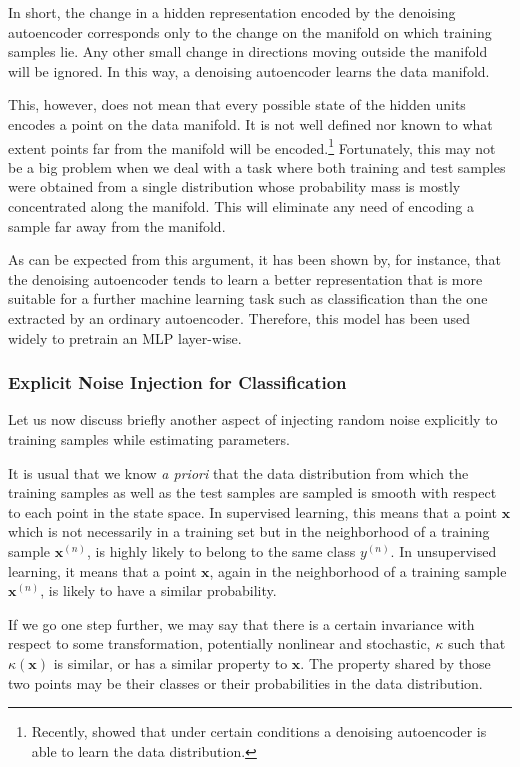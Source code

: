\documentclass{now}
\newcommand{\vect}[1]{\mathbf{#1}}
\newcommand{\vx}[0]{\vect{x}}
\begin{document}
In short, the change in a hidden representation encoded by the denoising
autoencoder corresponds only to the change on the manifold on which training
samples lie. Any other small change in directions moving outside the manifold
will be ignored. In this way, a denoising autoencoder learns the data manifold.

This, however, does not mean that every possible state of the hidden units
encodes a point on the data manifold. It is not well defined nor known to what
extent points far from the manifold will be encoded.\footnote{
    Recently, \citet{Bengio2014,Bengio2013nips} showed that under certain
    conditions a denoising autoencoder is able to learn the data distribution.
}
Fortunately, this may not be a big problem when we deal with a task where both
training and test samples were obtained from a single distribution whose
probability mass is mostly concentrated along the manifold. This will eliminate
any need of encoding a sample far away from the manifold.

As can be expected from this argument, it has been shown by, for instance,
\citet{Vincent2010} that the denoising autoencoder tends to learn a better
representation that is more suitable for a further machine learning task such as
classification than the one extracted by an ordinary autoencoder. Therefore,
this model has been used widely to pretrain an MLP layer-wise.

\subsubsection{Explicit Noise Injection for Classification}
\label{sec:noise_injection}

Let us now discuss briefly another aspect of injecting random noise explicitly
to training samples while estimating parameters.

It is usual that we know \textit{a priori} that the data distribution from which
the training samples as well as the test samples are sampled is smooth with
respect to each point in the state space. In supervised learning, this means
that a point $\vx$ which is not necessarily in a training set but in the
neighborhood of a training sample $\vx^{(n)}$, is highly likely to belong to the
same class $y^{(n)}$. In unsupervised learning, it means that a point $\vx$,
again in the neighborhood of a training sample $\vx^{(n)}$, is likely to have a
similar probability.

If we go one step further, we may say that there is a certain invariance with
respect to some transformation, potentially nonlinear and stochastic, $\kappa$
such that $\kappa(\vx)$ is similar, or has a similar property to $\vx$. The
property shared by those two points may be their classes or their probabilities
in the data distribution.
\end{document}
